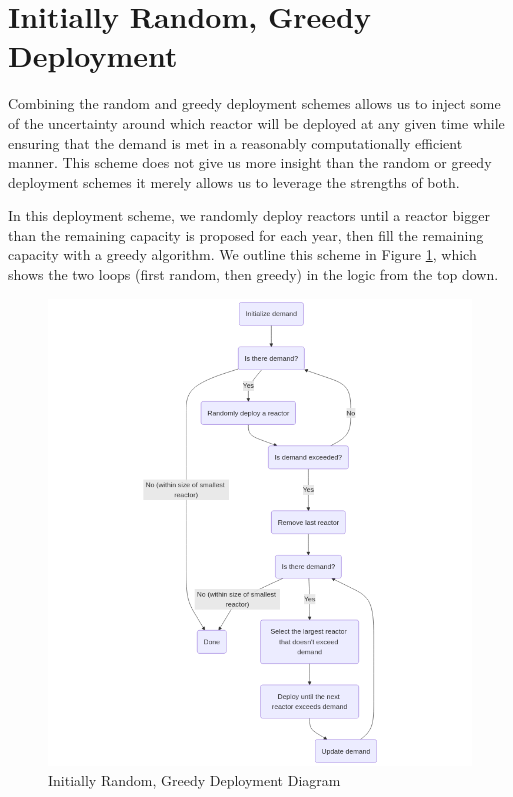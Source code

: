 \section{Initially Random, Greedy Deployment}
\label{sec:initially_random_greedy}

Combining the random and greedy deployment schemes allows us to inject some of
the uncertainty around which reactor will be deployed at any given time while
ensuring that the demand is met in a reasonably computationally efficient
manner. This scheme does not give us more insight than the random or greedy
deployment schemes it merely allows us to leverage the strengths of both.

In this deployment scheme, we randomly deploy reactors until a reactor bigger
than the remaining capacity is proposed for each year, then fill the remaining
capacity with a greedy algorithm. We outline this scheme in Figure
\ref{fig:init_random_greedy_diagram}, which shows the two loops (first random,
then greedy) in the logic from the top down.

\begin{figure}[H]
    \centering
    \includegraphics[scale=0.3]{images/schemes/random_greedy_diagram.png}
    \caption{Initially Random, Greedy Deployment Diagram}
    \label{fig:init_random_greedy_diagram}
\end{figure}

